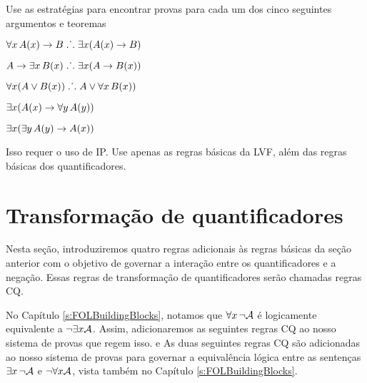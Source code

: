 \problempart
Use as estrat\'egias para encontrar provas para cada um dos cinco seguintes argumentos e teoremas
\begin{earg}
\item $\forall x\,\mathord{A}(x) \rightarrow B \mathrel{\ldotp\dot{}\,\ldotp} \exists x(\mathord{A}(x) \rightarrow B)$
\item $A \rightarrow \exists x\, \mathord{B}(x) \mathrel{\ldotp\dot{}\,\ldotp} \exists x(A \rightarrow \mathord{B}(x))$
\item $\forall x(A \vee \mathord{B}(x)) \mathrel{\ldotp\dot{}\,\ldotp} A \vee \forall x\,\mathord{B}(x))$
\item $\exists x(\mathord{A}(x) \rightarrow \forall y\,\mathord{A}(y))$
\item $\exists x(\exists y\,\mathord{A}(y) \rightarrow \mathord{A}(x))$
\end{earg}
Isso requer o uso de IP. Use apenas as regras b\'asicas da LVF, al\'em das regras b\'asicas dos quantificadores.


\chapter{Transforma\c c\~ao de quantificadores}\label{s:CQ}

Nesta se\c c\~ao, introduziremos quatro regras adicionais \`as regras b\'asicas da se\c c\~ao anterior com o objetivo de governar a intera\c c\~ao entre os quantificadores e a nega\c c\~ao. Essas regras de transforma\c c\~ao de quantificadores ser\~ao chamadas regras CQ.
 
No Capítulo  \ref{s:FOLBuildingBlocks}, notamos que $\forall x\, \neg\mathcal{A}$
   \'e logicamente equivalente a  $\neg\exists x\mathcal{A}$. Assim, adicionaremos as seguintes regras CQ ao nosso sistema de provas que regem isso. 
e
As duas seguintes  regras CQ  s\~ao adicionadas ao nosso sistema de provas para governar a equival\^encia l\'ogica entre as senten\c cas $\exists x\, \neg\mathcal{A}$  e   $\neg\forall x\mathcal{A}$, vista tamb\'em no  Capítulo  \ref{s:FOLBuildingBlocks}.

